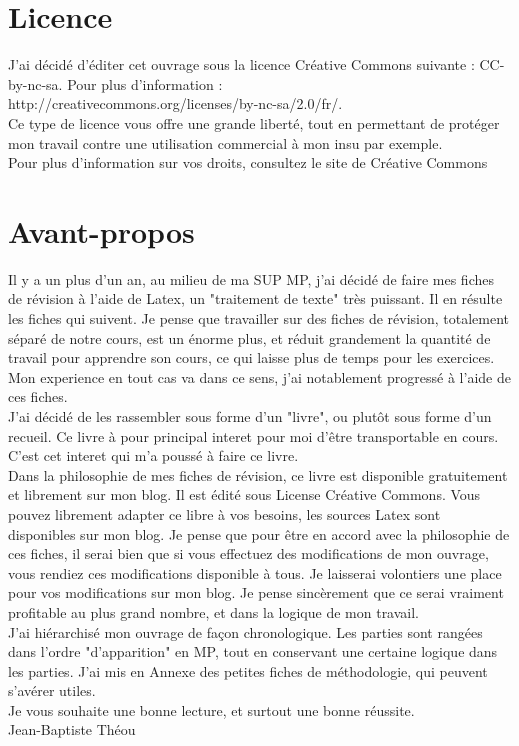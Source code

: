 \documentclass[a4paper, titlepage, draft,twoside]{book}
\begin{document}
\pagestyle{empty}
\titleGMPHY
\clearpage
\frontmatter                  %
\chapter{Licence}
J'ai décidé d'éditer cet ouvrage sous la licence Créative Commons suivante : CC-by-nc-sa. Pour plus d'information :\\
http://creativecommons.org/licenses/by-nc-sa/2.0/fr/.\\
Ce type de licence vous offre une grande liberté, tout en permettant de protéger mon travail contre une utilisation commercial à mon insu par exemple.\\
Pour plus d'information sur vos droits, consultez le site de Créative Commons
\chapter{Avant-propos}
Il y a un plus d'un an, au milieu de ma SUP MP, j'ai décidé de faire mes fiches de révision à l'aide de Latex, un "traitement de texte" très puissant. Il en résulte les fiches qui suivent. Je pense que travailler sur des fiches de révision, totalement séparé de notre cours, est un énorme plus, et réduit grandement la quantité de travail pour apprendre son cours, ce qui laisse plus de temps pour les exercices. Mon experience en tout cas va dans ce sens, j'ai notablement progressé à l'aide de ces fiches.\\
J'ai décidé de les rassembler sous forme d'un "livre", ou plutôt sous forme d'un recueil. Ce livre à pour principal interet pour moi d'être transportable en cours. C'est cet interet qui m'a poussé à faire ce livre.\\
Dans la philosophie de mes fiches de révision, ce livre est disponible gratuitement et librement sur mon blog. Il est édité sous License Créative Commons. Vous pouvez librement adapter ce libre à vos besoins, les sources Latex sont disponibles sur mon blog. Je pense que pour être en accord avec la philosophie de ces fiches, il serai bien que si vous effectuez des modifications de mon ouvrage, vous rendiez ces modifications disponible à tous. Je laisserai volontiers une place pour vos modifications sur mon blog. Je pense sincèrement que ce serai vraiment profitable au plus grand nombre, et dans la logique de mon travail.\\
J'ai hiérarchisé mon ouvrage de façon chronologique. Les parties sont rangées dans l'ordre "d'apparition" en MP, tout en conservant une certaine logique dans les parties. J'ai mis en Annexe des petites fiches de méthodologie, qui peuvent s'avérer utiles.\\
Je vous souhaite une bonne lecture, et surtout une bonne réussite.\\
Jean-Baptiste Théou
\end{document}
